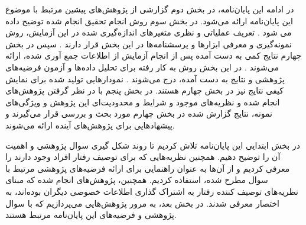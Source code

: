 در ادامه این پایان‌نامه، در بخش دوم گزارشی از پژوهش‌های پیشین مرتبط با موضوع این پایان‌نامه ارائه می‌شود.
در بخش سوم روش انجام تحقیق انجام شده توضیح داده می شود
\!.
تعریف عملیاتی و نظری متغیر‌های اندازه‌گیری شده در این آزمایش، روش نمونه‌گیری و معرفی ابزارها و پرسشنامه‌ها در این بخش قرار دارند
\!.
سپس در بخش چهارم نتایج کمی به دست آمده پس از انجام آزمایش از اطلاعات جمع آوری شده، ارائه می‌شوند
\!.
در این بخش  روش به کار رفته برای تحلیل داده‌ها و آزمون فرضیه‌های پژوهشی و نتایج  به دست آمده، درج  می‌شوند
\!.
نمودار‌هایی تولید شده برای نمایش کیفی نتایج نیز در بخش چهارم هستند.
در بخش پنجم با در نظر گرفتن پژوهش‌های انجام شده و نظریه‌های موجود و شرایط و محدودیت‌ای این پژوهش و ویژگی‌های نمونه، نتایج گزارش شده در بخش چهارم مورد بحث و بررسی
قرار می‌گیرند و پیشهادهایی برای پژوهش‌های آینده ارائه می‌شوند.

در بخش ابتدایی این پایان‌نامه تلاش کردیم تا روند شکل گیری سوال پژوهشی و اهمیت آن را توضیح دهیم.
همچنین نظریه‌هایی که برای توصیف رفتار افراد وجود دارند را معرفی کردیم و از آن‌ها به عنوان راهنمایی
برای ارائه فرضیه‌های پژوهشی مرتبط با سوال‌ مطرح شده، استفاده کردیم.
همچنین، پژوهش‌های انجام شده که مبنای نظریه‌های توصیف کننده رفتار به اشتراک گذاری اطلاعات خصوصی دیگران
بوده‌اند، به اختصار معرفی شدند. در بخش بعد، به مرور پژوهش‌هایی می‌پردازیم که با سوال پژوهشی و فرضیه‌های این پایان‌نامه مرتبط هستند.



